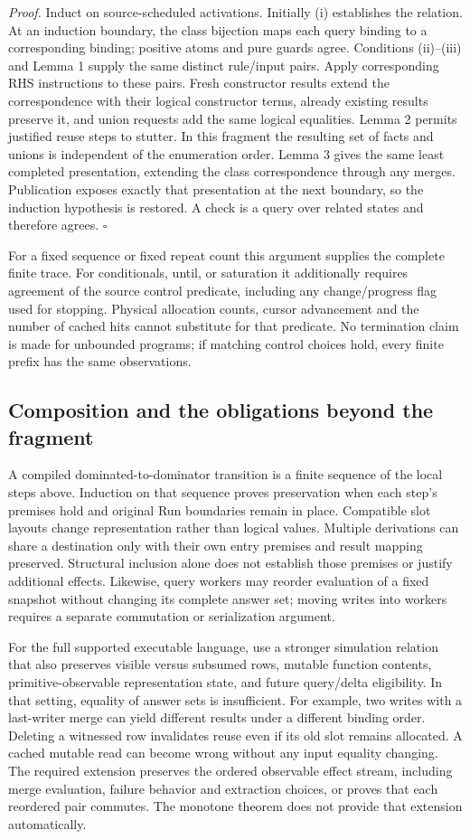 \emph{Proof.} Induct on source-scheduled activations. Initially (i) establishes
the relation. At an induction boundary, the class bijection maps each query
binding to a corresponding binding; positive atoms and pure guards agree.
Conditions (ii)--(iii) and Lemma 1 supply the same distinct rule/input pairs.
Apply corresponding RHS instructions to these pairs. Fresh constructor results
extend the correspondence with their logical constructor terms, already existing
results preserve it, and union requests add the same logical equalities.
Lemma 2 permits justified reuse steps to stutter. In this fragment the resulting
set of facts and unions is independent of the enumeration order. Lemma 3 gives
the same least completed presentation, extending the class correspondence through
any merges. Publication exposes exactly that presentation at the next boundary,
so the induction hypothesis is restored. A check is a query over related states
and therefore agrees. $\square$

For a fixed sequence or fixed repeat count this argument supplies the complete
finite trace. For conditionals, until, or saturation it additionally requires
agreement of the source control predicate, including any change/progress flag
used for stopping. Physical allocation counts, cursor advancement and the
number of cached hits cannot substitute for that predicate. No termination claim
is made for unbounded programs; if matching control choices hold, every finite
prefix has the same observations.

\subsection{Composition and the obligations beyond the fragment}
A compiled dominated-to-dominator transition is a finite sequence of the local
steps above. Induction on that sequence proves preservation when each step's
premises hold and original Run boundaries remain in place. Compatible slot
layouts change representation rather than logical values. Multiple derivations
can share a destination only with their own entry premises and result mapping
preserved. Structural inclusion alone does not establish those premises or
justify additional effects. Likewise, query workers may reorder evaluation of
a fixed snapshot without changing its complete answer set; moving writes into
workers requires a separate commutation or serialization argument.

For the full supported executable language, use a stronger simulation relation
that also preserves visible versus subsumed rows, mutable function contents,
primitive-observable representation state, and future query/delta eligibility.
In that setting, equality of answer sets is insufficient. For example, two writes
with a last-writer merge can yield different results under a different binding
order. Deleting a witnessed row invalidates reuse even if its old slot remains
allocated. A cached mutable read can become wrong without any input equality
changing. The required extension preserves the ordered observable effect stream,
including merge evaluation, failure behavior and extraction choices, or proves
that each reordered pair commutes. The monotone theorem does not provide that
extension automatically.

